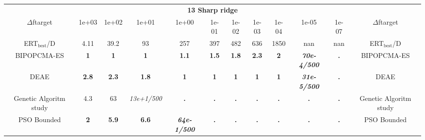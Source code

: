 \begin{tabular}{cccccccccccc}
 & \multicolumn{10}{c}{{\normalsize \textbf{13 Sharp ridge}}}\\
$\Delta$ftarget& 1e+03& 1e+02& 1e+01& 1e+00& 1e-01& 1e-02& 1e-03& 1e-04& 1e-05& 1e-07 & $\Delta$ftarget \\
ERT$_{\textrm{best}}$/D& 4.11& 39.2& 93& 257& 397& 482& 636& 1850& nan& nan & ERT$_{\textrm{best}}$/D \\
\hline
BIPOPCMA-ES & \textbf{1} & \textbf{1} & \textbf{1} & \textbf{1.1} & \textbf{1.5} & \textbf{1.8} & \textbf{2.3} & \textbf{2} & \textbf{\textit{70e-4}\textit{/500}} & \textbf{.} & BIPOPCMA-ES \cite{add_an_entry_for_BIPOPCMA-ES_in_bbob.bib}\\
DEAE & \textbf{2.8} & \textbf{2.3} & \textbf{1.8} & \textbf{1} & \textbf{1} & \textbf{1} & \textbf{1} & \textbf{1} & \textbf{\textit{31e-5}\textit{/500}} & \textbf{.} & DEAE \cite{add_an_entry_for_DEAE_in_bbob.bib}\\
Genetic Algoritm study & 4.3 & 63 & \textit{13e+1}\textit{/500} & \textbf{.} & \textbf{.} & \textbf{.} & \textbf{.} & \textbf{.} & \textbf{.} & \textbf{.} & Genetic Algoritm study \cite{add_an_entry_for_Genetic Algoritm study_in_bbob.bib}\\
PSO Bounded & \textbf{2} & \textbf{5.9} & \textbf{6.6} & \textbf{\textit{64e-1}\textit{/500}} & \textbf{.} & \textbf{.} & \textbf{.} & \textbf{.} & \textbf{.} & \textbf{.} & PSO Bounded \cite{add_an_entry_for_PSO Bounded_in_bbob.bib}
\end{tabular}
